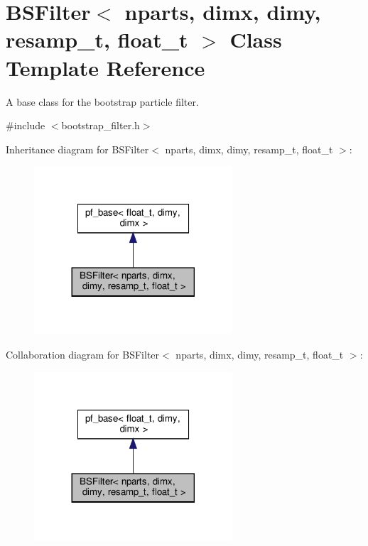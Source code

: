 \hypertarget{classBSFilter}{}\section{B\+S\+Filter$<$ nparts, dimx, dimy, resamp\+\_\+t, float\+\_\+t $>$ Class Template Reference}
\label{classBSFilter}


A base class for the bootstrap particle filter.  




{\ttfamily \#include $<$bootstrap\+\_\+filter.\+h$>$}



Inheritance diagram for B\+S\+Filter$<$ nparts, dimx, dimy, resamp\+\_\+t, float\+\_\+t $>$\+:\nopagebreak
\begin{figure}[H]
\begin{center}
\leavevmode
\includegraphics[width=209pt]{classBSFilter__inherit__graph}
\end{center}
\end{figure}


Collaboration diagram for B\+S\+Filter$<$ nparts, dimx, dimy, resamp\+\_\+t, float\+\_\+t $>$\+:\nopagebreak
\begin{figure}[H]
\begin{center}
\leavevmode
\includegraphics[width=209pt]{classBSFilter__coll__graph}
\end{center}
\end{figure}
